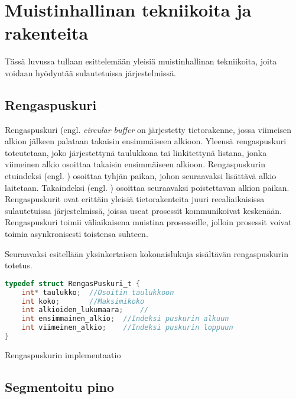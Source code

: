 \chapter{Muistinhallinan tekniikoita ja rakenteita} \label{Neljäs luku}

Tässä luvussa tullaan esittelemään yleisiä muistinhallinan tekniikoita, joita voidaan hyödyntää sulautetuissa järjestelmissä.

\section{Rengaspuskuri}

Rengaspuskuri (engl. \textit{circular buffer} on järjestetty tietorakenne, jossa viimeisen alkion jälkeen palataan takaisin ensimmäiseen alkioon. Yleensä rengaspuskuri toteutetaan, joko järjestettynä taulukkona tai linkitettynä listana, jonka viimeinen alkio osoittaa takaisin ensimmäiseen alkioon. Rengaspuskurin etuindeksi (engl. ) osoittaa tyhjän paikan, johon seuraavaksi lisättävä alkio laitetaan. Takaindeksi (engl. ) osoittaa seuraavaksi poistettavan alkion paikan. Rengaspuskurit ovat erittäin yleisiä tietorakenteita juuri reealiaikaisissa sulautetuissa järjestelmissä, joissa useat prosessit kommunikoivat keskenään. Rengaspuskuri toimii väliaikaisena muistina prosesseille, jolloin prosessit voivat toimia asynkronisesti toistensa suhteen.\cite{c2015book}

Seuraavaksi esitellään yksinkertaisen kokonaislukuja sisältävän rengaspuskurin totetus.

\begin{algorithm}[tbh]
\begin{lstlisting}[language=C]
typedef struct RengasPuskuri_t {
    int* taulukko;  //Osoitin taulukkoon
    int koko;       //Maksimikoko
    int alkioiden_lukumaara;    //
    int ensimmainen_alkio;  //Indeksi puskurin alkuun
    int viimeinen_alkio;    //Indeksi puskurin loppuun
}
\end{lstlisting}
\caption{Rengaspuskurin implementaatio\label{alg:Rengaspuskuri}}
\end{algorithm}

\section{Segmentoitu pino}


